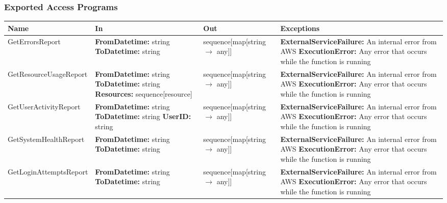\documentclass[12pt, titlepage]{article}
\begin{document}
\subsubsection{Exported Access Programs}
\begin{center}
  \begin{tabular}{p{4.5cm} p{4cm} p{4cm} p{4cm}}
    \hline
    \textbf{Name} & \textbf{In} & \textbf{Out} & \textbf{Exceptions} \\
    \hline

    GetErrorsReport & \textbf{FromDatetime:} string \newline
    \textbf{ToDatetime:} string&
    sequence[map[string $\rightarrow$ any]] &
    \textbf{ExternalServiceFailure:} An internal error from AWS
    \newline \textbf{ExecutionError:} Any error that occurs while the
    function is running \\
    \hline
    GetResourceUsageReport & \textbf{FromDatetime:} string \newline
    \textbf{ToDatetime:} string \newline
    \textbf{Resources:} \newline sequence[resource]&
    sequence[map[string $\rightarrow$ any]] &
    \textbf{ExternalServiceFailure:} An internal error from AWS
    \newline \textbf{ExecutionError:} Any error that occurs while the
    function is running \\
    \hline
    GetUserActivityReport & \textbf{FromDatetime:} string \newline
    \textbf{ToDatetime:} string \newline
    \textbf{UserID:} string&
    sequence[map[string $\rightarrow$ any]] &
    \textbf{ExternalServiceFailure:} An internal error from AWS
    \newline \textbf{ExecutionError:} Any error that occurs while the
    function is running \\
    \hline
    GetSystemHealthReport & \textbf{FromDatetime:} string \newline
    \textbf{ToDatetime:} string &
    sequence[map[string $\rightarrow$ any]] &
    \textbf{ExternalServiceFailure:} An internal error from AWS
    \newline \textbf{ExecutionError:} Any error that occurs while the
    function is running \\
    \hline
    GetLoginAttemptsReport & \textbf{FromDatetime:} string \newline
    \textbf{ToDatetime:} string &
    sequence[map[string $\rightarrow$ any]] &
    \textbf{ExternalServiceFailure:} An internal error from AWS
    \newline \textbf{ExecutionError:} Any error that occurs while the
    function is running \\
    \hline
  \end{tabular}
\end{center}
\end{document}
